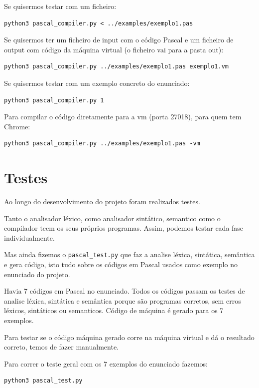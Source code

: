 \documentclass[12pt,a4paper]{report}
\begin{document}
Se quisermos testar com um ficheiro:
\begin{verbatim}
python3 pascal_compiler.py < ../examples/exemplo1.pas
\end{verbatim}

Se quisermos ter um ficheiro de input com o código Pascal e um ficheiro de output com código da máquina virtual (o ficheiro vai para a pasta out):
\begin{verbatim}
python3 pascal_compiler.py ../examples/exemplo1.pas exemplo1.vm
\end{verbatim}

Se quisermos testar com um exemplo concreto do enunciado:
\begin{verbatim}
python3 pascal_compiler.py 1
\end{verbatim}

Para compilar o código diretamente para a vm (porta 27018), para quem tem Chrome:
\begin{verbatim}
python3 pascal_compiler.py ../examples/exemplo1.pas -vm
\end{verbatim}
\chapter{Testes}

Ao longo do desenvolvimento do projeto foram realizados testes.

Tanto o analisador léxico, como analisador sintático, semantico como o compilador teem os seus próprios programas. Assim, podemos testar cada fase individualmente.

Mas ainda fizemos o \texttt{pascal\_test.py} que faz a analise léxica, sintática, semântica e gera código, isto tudo sobre os códigos em Pascal usados como exemplo no
enunciado do projeto.

Havia 7 códigos em Pascal no enunciado. Todos os códigos passam os testes de analise léxica, sintática e semântica porque são programas corretos, sem erros léxicos, sintáticos ou semanticos.
Código de máquina é gerado para os 7 exemplos.

Para testar se o código máquina gerado corre na máquina virtual e dá o resultado correto, temos de fazer manualmente.

\vspace{1em}

Para correr o teste geral com os 7 exemplos do enunciado fazemos:
\begin{verbatim}
python3 pascal_test.py
\end{verbatim}
\end{document}
